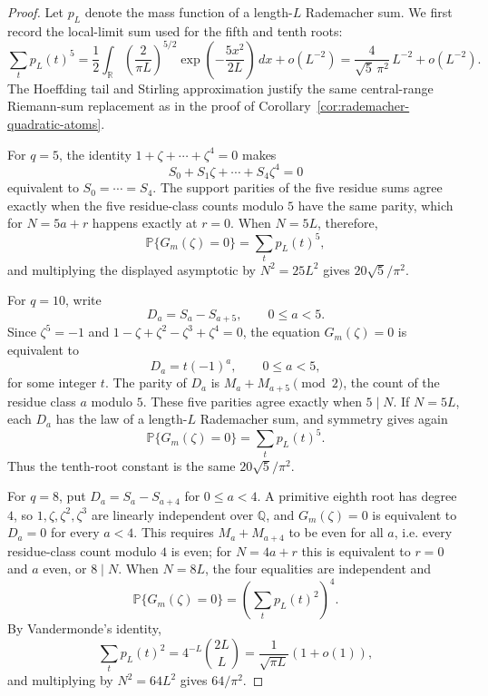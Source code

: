 \documentclass[11pt]{amsart}
\numberwithin{equation}{section}
\theoremstyle{definition}
\theoremstyle{remark}
\newcommand{\Prob}{\mathbb P}
\begin{document}
\begin{proof}
Let \(p_L\) denote the mass function of a length-\(L\) Rademacher sum.  We first
record the local-limit sum used for the fifth and tenth roots:
\[
  \sum_t p_L(t)^5
  =\frac12\int_{\mathbb R}
       \left(\frac{2}{\pi L}\right)^{5/2}
       \exp\!\left(-\frac{5x^2}{2L}\right)\,dx+o(L^{-2})
  =\frac{4}{\sqrt5\,\pi^2}\,L^{-2}+o(L^{-2}).
\]
The Hoeffding tail and Stirling approximation justify the same central-range
Riemann-sum replacement as in the proof of
Corollary~\ref{cor:rademacher-quadratic-atoms}.

For \(q=5\), the identity \(1+\zeta+\cdots+\zeta^4=0\) makes
\[
  S_0+S_1\zeta+\cdots+S_4\zeta^4=0
\]
equivalent to \(S_0=\cdots=S_4\).  The support parities of the five residue
sums agree exactly when the five residue-class counts modulo \(5\) have the
same parity, which for \(N=5a+r\) happens exactly at \(r=0\).  When \(N=5L\),
therefore,
\[
  \Prob\{G_m(\zeta)=0\}=\sum_t p_L(t)^5,
\]
and multiplying the displayed asymptotic by \(N^2=25L^2\) gives
\(20\sqrt5/\pi^2\).

For \(q=10\), write
\[
  D_a=S_a-S_{a+5},\qquad 0\le a<5.
\]
Since \(\zeta^5=-1\) and
\(1-\zeta+\zeta^2-\zeta^3+\zeta^4=0\), the equation \(G_m(\zeta)=0\) is
equivalent to
\[
  D_a=t(-1)^a,\qquad 0\le a<5,
\]
for some integer \(t\).  The parity of \(D_a\) is
\(M_a+M_{a+5}\pmod2\), the count of the residue class \(a\) modulo \(5\).
These five parities agree exactly when \(5\mid N\).  If \(N=5L\), each \(D_a\)
has the law of a length-\(L\) Rademacher sum, and symmetry gives again
\[
  \Prob\{G_m(\zeta)=0\}=\sum_t p_L(t)^5.
\]
Thus the tenth-root constant is the same \(20\sqrt5/\pi^2\).

For \(q=8\), put \(D_a=S_a-S_{a+4}\) for \(0\le a<4\).  A primitive eighth root
has degree \(4\), so \(1,\zeta,\zeta^2,\zeta^3\) are linearly independent over
\(\mathbb Q\), and \(G_m(\zeta)=0\) is equivalent to \(D_a=0\) for every
\(a<4\).  This requires \(M_a+M_{a+4}\) to be even for all \(a\), i.e. every
residue-class count modulo \(4\) is even; for \(N=4a+r\) this is equivalent to
\(r=0\) and \(a\) even, or \(8\mid N\).  When \(N=8L\), the four equalities are
independent and
\[
  \Prob\{G_m(\zeta)=0\}
  =\left(\sum_t p_L(t)^2\right)^4.
\]
By Vandermonde's identity,
\[
  \sum_t p_L(t)^2=4^{-L}\binom{2L}{L}
  =\frac1{\sqrt{\pi L}}(1+o(1)),
\]
and multiplying by \(N^2=64L^2\) gives \(64/\pi^2\).


\end{proof}
\end{document}
